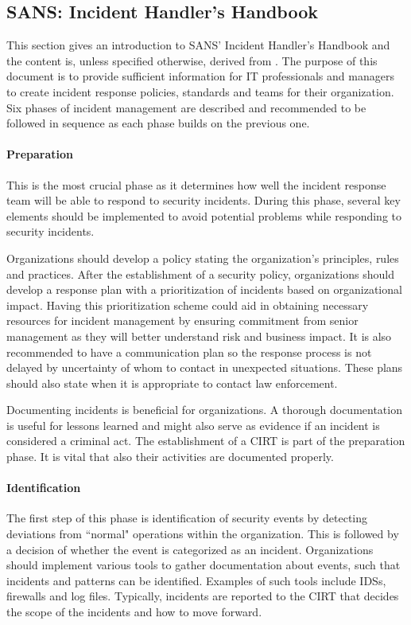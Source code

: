 \subsection{SANS: Incident Handler's Handbook}
This section gives an introduction to SANS' Incident Handler's Handbook and the content is, unless specified otherwise, derived from \cite{SANShandbook}. The purpose of this document is to provide sufficient information for IT professionals and managers to create incident response policies, standards and teams for their organization. Six phases of incident management are described and recommended to be followed in sequence as each phase builds on the previous one. 

\paragraph{Preparation} 
This is the most crucial phase as it determines how well the incident response team will be able to respond to security incidents. During this phase, several key elements should be implemented to avoid potential problems while responding to security incidents.

Organizations should develop a policy stating the organization's principles, rules and practices. After the establishment of a security policy, organizations should develop a response plan with a prioritization of incidents based on organizational impact. Having this prioritization scheme could aid in obtaining necessary resources for incident management by ensuring commitment from senior management as they will better understand risk and business impact. It is also recommended to have a communication plan so the response process is not delayed by uncertainty of whom to contact in unexpected situations. These plans should also state when it is appropriate to contact law enforcement.

Documenting incidents is beneficial for organizations. A thorough documentation is useful for lessons learned and might also serve as evidence if an incident is considered a criminal act. The establishment of a \ac{CIRT} is part of the preparation phase. It is vital that also their activities are documented properly. 

\paragraph{Identification} 
The first step of this phase is identification of security events by detecting deviations from ``normal" operations within the organization. This is followed by a decision of whether the event is categorized as an incident. Organizations should implement various tools to gather documentation about events, such that incidents and patterns can be identified. Examples of such tools include \acp{IDS}, firewalls and log files. Typically, incidents are reported to the \ac{CIRT} that decides the scope of the incidents and how to move forward.

